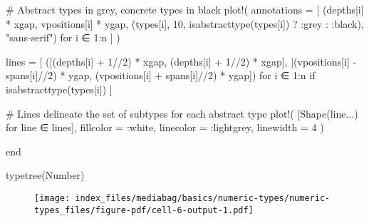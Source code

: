 \documentclass[
  letterpaper,
  DIV=11,
  numbers=noendperiod]{scrreprt}
\newenvironment{Shaded}{\begin{snugshade}}{\end{snugshade}}
\newcommand{\CommentTok}[1]{\textcolor[rgb]{0.37,0.37,0.37}{#1}}
\newcommand{\DataTypeTok}[1]{\textcolor[rgb]{0.68,0.00,0.00}{#1}}
\newcommand{\FloatTok}[1]{\textcolor[rgb]{0.68,0.00,0.00}{#1}}
\newcommand{\FunctionTok}[1]{\textcolor[rgb]{0.28,0.35,0.67}{#1}}
\newcommand{\KeywordTok}[1]{\textcolor[rgb]{0.00,0.23,0.31}{#1}}
\newcommand{\NormalTok}[1]{\textcolor[rgb]{0.00,0.23,0.31}{#1}}
\newcommand{\OperatorTok}[1]{\textcolor[rgb]{0.37,0.37,0.37}{#1}}
\newcommand{\StringTok}[1]{\textcolor[rgb]{0.13,0.47,0.30}{#1}}
\begin{document}
\begin{Shaded}
\begin{Highlighting}[]
    \CommentTok{\# Abstract types in grey, concrete types in black}
    \FunctionTok{plot!}\NormalTok{(}
\NormalTok{        annotations }\OperatorTok{=}\NormalTok{ [}
\NormalTok{            (depths[i] }\OperatorTok{*}\NormalTok{ xgap, vpositions[i] }\OperatorTok{*}\NormalTok{ ygap,}
\NormalTok{            (types[i], }\FloatTok{10}\NormalTok{, }\FunctionTok{isabstracttype}\NormalTok{(types[i]) ? }\OperatorTok{:}\NormalTok{grey }\OperatorTok{:} \OperatorTok{:}\NormalTok{black), }\StringTok{"sans{-}serif"}\NormalTok{)}
\NormalTok{            for i }\OperatorTok{∈} \FloatTok{1}\OperatorTok{:}\NormalTok{n}
\NormalTok{        ]}
\NormalTok{    )}

\NormalTok{    lines }\OperatorTok{=}\NormalTok{ [}
\NormalTok{        ([(depths[i] }\OperatorTok{+} \FloatTok{1}\OperatorTok{//}\FloatTok{2}\NormalTok{) }\OperatorTok{*}\NormalTok{ xgap, (depths[i] }\OperatorTok{+} \FloatTok{1}\OperatorTok{//}\FloatTok{2}\NormalTok{) }\OperatorTok{*}\NormalTok{ xgap],}
\NormalTok{        [(vpositions[i] }\OperatorTok{{-}}\NormalTok{ spans[i]}\OperatorTok{//}\FloatTok{2}\NormalTok{) }\OperatorTok{*}\NormalTok{ ygap, (vpositions[i] }\OperatorTok{+}\NormalTok{ spans[i]}\OperatorTok{//}\FloatTok{2}\NormalTok{) }\OperatorTok{*}\NormalTok{ ygap])}
\NormalTok{        for i }\OperatorTok{∈} \FloatTok{1}\OperatorTok{:}\NormalTok{n if }\FunctionTok{isabstracttype}\NormalTok{(types[i])}
\NormalTok{    ]}

    \CommentTok{\# Lines delineate the set of subtypes for each abstract type}
    \FunctionTok{plot!}\NormalTok{(}
\NormalTok{        [}\FunctionTok{Shape}\NormalTok{(line}\OperatorTok{...}\NormalTok{) for line }\OperatorTok{∈}\NormalTok{ lines],}
\NormalTok{        fillcolor }\OperatorTok{=} \OperatorTok{:}\NormalTok{white,}
\NormalTok{        linecolor }\OperatorTok{=} \OperatorTok{:}\NormalTok{lightgrey,}
\NormalTok{        linewidth }\OperatorTok{=} \FloatTok{4}
\NormalTok{    )}
    
\KeywordTok{end}

\FunctionTok{typetree}\NormalTok{(}\DataTypeTok{Number}\NormalTok{)}
\end{Highlighting}
\end{Shaded}

\begin{figure}[H]

{\centering \texttt{[image: index\_files/mediabag/basics/numeric-types/numeric-types\_files/figure-pdf/cell-6-output-1.pdf]}

}

\end{figure}
\end{document}
